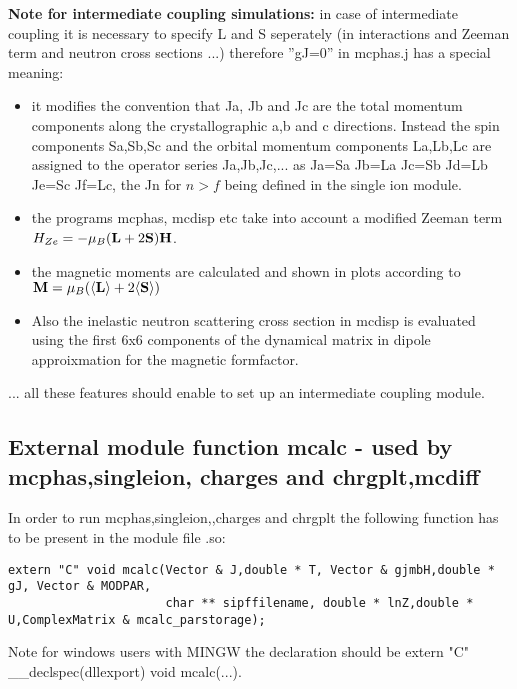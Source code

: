 {\bf Note for intermediate coupling simulations:} in case of intermediate coupling
it is necessary to specify
L and S seperately (in interactions and Zeeman term and neutron cross sections ...)
therefore  ''gJ=0'' in {\prg mcphas.j} has a special meaning:
\begin{itemize}
\item  it modifies
the convention that Ja, Jb and Jc are the total momentum components along the
crystallographic a,b and c directions. Instead
the spin components Sa,Sb,Sc and the orbital momentum components La,Lb,Lc are
assigned to the operator series Ja,Jb,Jc,... as  Ja=Sa Jb=La Jc=Sb Jd=Lb Je=Sc 
Jf=Lc, the Jn for $n>f$ being defined in the single ion module. 
\item the programs {\prg mcphas, mcdisp etc} take into account
 a modified Zeeman term $H_{Ze}=-\mu_B(\mathbf L+2\mathbf S)\mathbf H$.
\item the magnetic moments are calculated and shown in plots according 
to $\mathbf M=\mu_B(\langle \mathbf L\rangle+2\langle \mathbf S\rangle)$
\item Also the inelastic neutron scattering cross section in {\prg mcdisp} is evaluated using the %
first
6x6 components of the dynamical matrix  in dipole approixmation for the magnetic formfactor.
\end{itemize}
... all these features should enable to set up an intermediate coupling module.


\subsection{External module function {\prg mcalc} - used by {\prg mcphas},{\prg singleion},{\prg %
charges} and {\prg chrgplt},{\prg mcdiff} }

In order to run {\prg mcphas},{\prg singleion},,{\prg charges} and {\prg %
chrgplt} the following function has to be 
present in the module file {\prg *.so}:

\begin{verbatim}
extern "C" void mcalc(Vector & J,double * T, Vector & gjmbH,double * gJ, Vector & MODPAR,
                      char ** sipffilename, double * lnZ,double * U,ComplexMatrix & mcalc_parstorage);
\end{verbatim}

Note for windows users with MINGW the declaration should be {\prg extern "C" \_\_declspec(dllexport) void %
mcalc(...)}.

